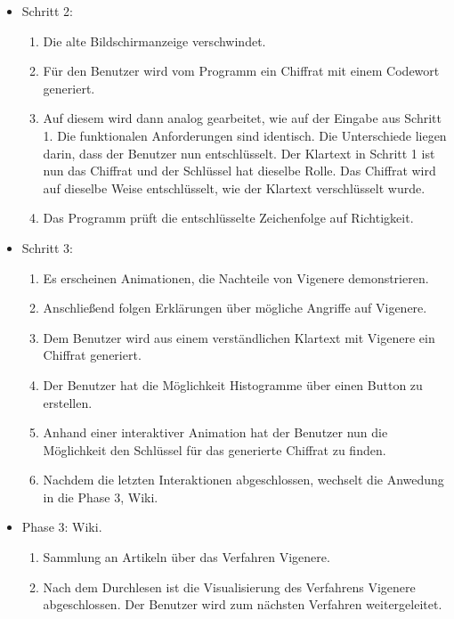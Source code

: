 \documentclass{article}
\begin{document}
\begin{itemize}[label={}]
 \item Schritt 2:

	\begin{enumerate}
	 \item Die alte Bildschirmanzeige verschwindet.
	 \item Für den Benutzer wird vom Programm ein Chiffrat mit einem Codewort generiert. 
	 \item[] Auf diesem wird dann analog gearbeitet, wie auf der Eingabe aus Schritt 1. Die 
	         funktionalen Anforderungen sind identisch. Die Unterschiede liegen darin, dass der Benutzer 
                 nun entschlüsselt. Der Klartext in Schritt 1 ist nun das Chiffrat und der Schlüssel hat 
                 dieselbe Rolle. Das Chiffrat wird auf dieselbe Weise entschlüsselt, wie der Klartext verschlüsselt wurde. 
	 \item Das Programm prüft die entschlüsselte Zeichenfolge auf Richtigkeit.
	\end{enumerate}
	
 \item Schritt 3:
 
	\begin{enumerate}
         \item Es erscheinen Animationen, die Nachteile von Vigenere demonstrieren.
         \item Anschließend folgen Erklärungen über mögliche Angriffe auf Vigenere.
         \item Dem Benutzer wird aus einem verständlichen Klartext mit Vigenere ein Chiffrat generiert.
         \item Der Benutzer hat die Möglichkeit Histogramme über einen Button zu erstellen.
         \item Anhand einer interaktiver Animation hat der Benutzer nun die Möglichkeit den Schlüssel für das generierte Chiffrat zu finden.
         \item Nachdem die letzten Interaktionen abgeschlossen, wechselt die Anwedung in die Phase 3, Wiki.
        \end{enumerate}
	
 \item Phase 3: Wiki.

	\begin{enumerate}
	 \item Sammlung an Artikeln über das Verfahren Vigenere.
	 \item Nach dem Durchlesen ist die Visualisierung des Verfahrens Vigenere abgeschlossen. Der Benutzer wird zum nächsten Verfahren weitergeleitet.
 	\end{enumerate}

\end{itemize}
\end{document}
